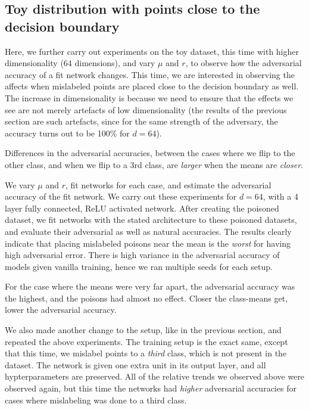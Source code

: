 \documentclass[12pt, oneside]{book}
\begin{document}
\subsection{Toy distribution with points close to the decision boundary}

Here, we further carry out experiments on the toy dataset, this time with higher
dimensionality (64 dimensions), and vary $\mu$ and $r$, to observe how the
adversarial accuracy of a fit network changes. This time, we are interested in
observing the affects when mislabeled points are placed close to the decision
boundary as well. The increase in dimensionality is because we need to ensure
that the effects we see are not merely artefacts of low dimensionality (the
results of the previous section are such artefacts, since for the same strength
of the adversary, the accuracy turns out to be 100\% for $d=64$).

Differences in the adversarial accuracies, between the cases where we flip to
the other class, and when we flip to a 3rd class, are \emph{larger} when the
means are \emph{closer}.

We vary $\mu$ and $r$, fit networks for each case, and estimate the adversarial
accuracy of the fit network. We carry out these experiments for $d=64$, with a 4
layer fully connected, ReLU activated network. After creating the poisoned
dataset, we fit networks with the stated architecture to these poisoned
datasets, and evaluate their adversarial as well as natural accuracies. The
results clearly indicate that placing mislabeled poisons near the mean is the
\emph{worst} for having high adversarial error. There is high variance in the
adversarial accuracy of models given vanilla training, hence we ran multiple
seeds for each setup.

For the case where the means were very far apart, the adversarial accuracy was
the highest, and the poisons had almost no effect. Closer the class-means get,
lower the adversarial accuracy.

We also made another change to the setup, like in the previous section, and
repeated the above experiments. The training setup is the exact same, except
that this time, we mislabel points to a \emph{third} class, which is not present
in the dataset. The network is given one extra unit in its output layer, and all
hypterparameters are preserved. All of the relative trends we observed above
were observed again, but this time the networks had \emph{higher} adversarial
accuracies for cases where mislabeling was done to a third class.
\end{document}
